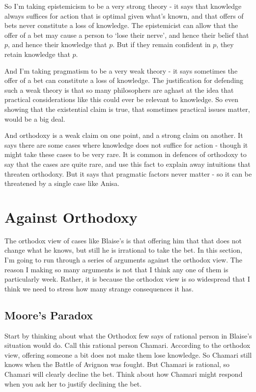 \documentclass[11pt,]{book}
\begin{document}
So I'm taking epistemicism to be a very strong theory - it says that knowledge always suffices for action that is optimal given what's known, and that offers of bets never constitute a loss of knowledge. The epistemicist can allow that the offer of a bet may cause a person to `lose their nerve', and hence their belief that \(p\), and hence their knowledge that \(p\). But if they remain confident in \(p\), they retain knowledge that \(p\).

And I'm taking pragmatism to be a very weak theory - it says sometimes the offer of a bet can constitute a loss of knowledge. The justification for defending such a weak theory is that so many philosophers are aghast at the idea that practical considerations like this could ever be relevant to knowledge. So even showing that the existential claim is true, that sometimes practical issues matter, would be a big deal.

And orthodoxy is a weak claim on one point, and a strong claim on another. It says there are some cases where knowledge does not suffice for action - though it might take these cases to be very rare. It is common in defences of orthodoxy to say that the cases are quite rare, and use this fact to explain away intuitions that threaten orthodoxy. But it says that pragmatic factors never matter - so it can be threatened by a single case like Anisa.

\hypertarget{orthodox}{%
\section{Against Orthodoxy}\label{orthodox}}

The orthodox view of cases like Blaise's is that offering him that that does not change what he knows, but still he is irrational to take the bet. In this section, I'm going to run through a series of arguments against the orthodox view. The reason I making so many arguments is not that I think any one of them is particularly week. Rather, it is because the orthodox view is so widespread that I think we need to stress how many strange consequences it has.

\hypertarget{orthodoxmoore}{%
\subsection{Moore's Paradox}\label{orthodoxmoore}}

Start by thinking about what the Orthodox few says of rational person in Blaise's situation would do. Call this rational person Chamari. According to the orthodox view, offering someone a bit does not make them lose knowledge. So Chamari still knows when the Battle of Avignon was fought. But Chamari is rational, so Chamari will clearly decline the bet. Think about how Chamari might respond when you ask her to justify declining the bet.
\end{document}
